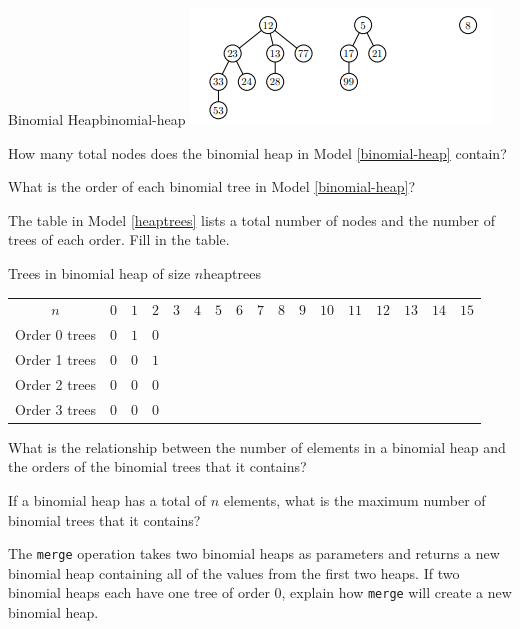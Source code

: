 \documentclass{tufte-handout}
\begin{document}
\begin{questions}
\begin{model*}{Binomial Heap}{binomial-heap}
  \includegraphics[]{binomial_heap.PNG}
  \label{binomial-heap}
\end{model*}

How many total nodes does the binomial heap in Model \ref{binomial-heap} contain?

\item What is the order of each binomial tree in Model \ref{binomial-heap}?

\item The table in Model \ref{heaptrees} lists a total number of nodes and the number of trees of each order. Fill in the table.

\begin{model*}{Trees in binomial heap of size $n$}{heaptrees}
  \centering
  \begin{tabular}{c|cccccccccccccccc}
    $n$ & $0$ & $1$ & $2$ & $3$ & $4$ & $5$ & $6$ & $7$ & $8$ & $9$ & $10$
    & $11$ & $12$ & $13$ & $14$ & $15$  \\[8pt]
    Order 0 trees & $0$ & $1$ & $0$ & & & & & & & & & & & & & \\[8pt]
    Order 1 trees & $0$ & $0$ & $1$ & & & & & & & & & & & & & \\[8pt]
    Order 2 trees & $0$ & $0$ & $0$ & & & & & & & & & & & & & \\[8pt]
    Order 3 trees & $0$ & $0$ & $0$ & & & & & & & & & & & & & \\[8pt]
  \end{tabular}
  \label{heaptrees}
\end{model*}

\item What is the relationship between the number of elements in a binomial heap and the orders of the binomial trees that it contains?

\item If a binomial heap has a total of $n$ elements, what is the maximum number of binomial trees that it contains? 

\item The \verb|merge| operation takes two binomial heaps as parameters and returns a new binomial heap containing all of the values from the first two heaps. If two binomial heaps each have one tree of order 0, explain how \verb|merge| will create a new binomial heap.


\end{questions}
\end{document}
